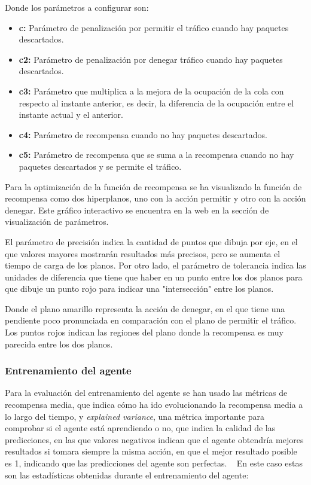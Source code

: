Donde los parámetros a configurar son:
\begin{itemize}
    \item \textbf{c:} Parámetro de penalización por permitir el tráfico cuando hay paquetes descartados.
    \item \textbf{c2:} Parámetro de penalización por denegar tráfico cuando hay paquetes descartados.
    \item \textbf{c3:} Parámetro que multiplica a la mejora de la ocupación de la cola con respecto al instante anterior, es decir, la diferencia de la ocupación entre el instante actual y el anterior.
    \item \textbf{c4:} Parámetro de recompensa cuando no hay paquetes descartados.
    \item \textbf{c5:} Parámetro de recompensa que se suma a la recompensa cuando no hay paquetes descartados y se permite el tráfico.
\end{itemize}

Para la optimización de la función de recompensa se ha visualizado la función de recompensa como dos hiperplanos, uno con la acción permitir y otro con la acción denegar. Este gráfico interactivo se encuentra en la web en la sección de visualización de parámetros.

El parámetro de precisión indica la cantidad de puntos que dibuja por eje, en el que valores mayores mostrarán resultados más precisos, pero se aumenta el tiempo de carga de los planos. Por otro lado, el parámetro de tolerancia indica las unidades de diferencia que tiene que haber en un punto entre los dos planos para que dibuje un punto rojo para indicar una "intersección" entre los planos.


Donde el plano amarillo representa la acción de denegar, en el que tiene una pendiente poco pronunciada en comparación con el plano de permitir el tráfico.
Los puntos rojos indican las regiones del plano donde la recompensa es muy parecida entre los dos planos.

\subsubsection{Entrenamiento del agente}
Para la evaluación del entrenamiento del agente se han usado las métricas de recompensa media, que indica cómo ha ido evolucionando la recompensa media a lo largo del tiempo, y \textit{explained variance}, una métrica importante para comprobar si el agente está aprendiendo o no, que indica la calidad de las predicciones, en las que valores negativos indican que el agente obtendría mejores resultados si tomara siempre la misma acción, en que el mejor resultado posible es 1, indicando que las predicciones del agente son perfectas. ~\cite{JonathanHui2023}
En este caso estas son las estadísticas obtenidas durante el entrenamiento del agente:

